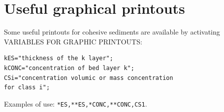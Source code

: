 \section{Useful graphical printouts}
Some useful printouts for cohesive sediments are available by activating {\ttfamily VARIABLES FOR GRAPHIC PRINTOUTS}:
\begin{lstlisting}[frame=trBL]  
kES="thickness of the k layer";
kCONC="concentration of bed layer k";
CSi="concentration volumic or mass concentration 
for class i";
\end{lstlisting}  
Examples of use: \texttt{*ES,**ES,*CONC,**CONC,CS1}.
